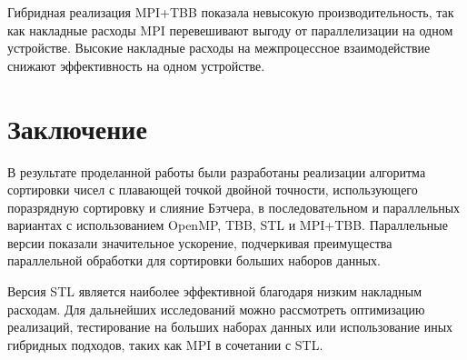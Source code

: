 \documentclass[12pt,a4paper]{extarticle}
\begin{document}
	Гибридная реализация MPI+TBB показала невысокую производительность, так как накладные расходы MPI перевешивают выгоду от параллелизации на одном устройстве. 
	Высокие накладные расходы на межпроцессное взаимодействие снижают эффективность на одном устройстве.
		
	\section*{Заключение}
	В результате проделанной работы были разработаны реализации алгоритма сортировки чисел с плавающей точкой двойной точности, использующего поразрядную сортировку и слияние Бэтчера, в последовательном и параллельных вариантах с использованием OpenMP, TBB, STL и MPI+TBB. Параллельные версии показали значительное ускорение, подчеркивая преимущества параллельной обработки для сортировки больших наборов данных.
	
	Версия STL является наиболее эффективной благодаря низким накладным расходам. Для дальнейших исследований можно рассмотреть оптимизацию реализаций, тестирование на больших наборах данных или использование иных гибридных подходов, таких как MPI в сочетании с  STL.
	
\end{document}
